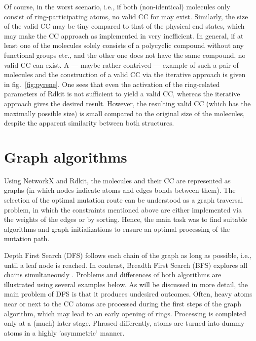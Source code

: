 Of course, in the worst scenario, i.e., if both (non-identical) molecules only consist of ring-participating atoms, no valid CC for \trafo may exist. Similarly, the size of the valid CC may be tiny compared to that of the physical end states, which may make the CC approach as implemented in \trafo very inefficient.  In general, if at least one of the molecules solely consists of a polycyclic compound without any functional groups etc., and the other one does not have the same compound, no valid CC can exist. 
A --- maybe rather contrived --- example of such a pair of molecules and the construction of a valid CC via the iterative approach is given in fig.~\ref{fig:pyrene}. One sees that even the activation of the ring-related parameters of Rdkit is not sufficient to yield a valid CC, whereas the iterative approach gives the desired result. However, the resulting valid CC (which has the maximally possible size) is small compared to the original size of the molecules, despite the apparent similarity between both structures.



\section{Graph algorithms}

Using NetworkX and Rdkit, the molecules and their CC are
represented as graphs (in which nodes indicate atoms and edges bonds
between them). The selection of the optimal mutation route can be
understood as a graph traversal problem, in which the constraints mentioned
above are either implemented via the weights of the edges or by sorting.
Hence, the main task was to find suitable algorithms and graph initializations
to ensure an optimal processing of the mutation path.

Depth First Search (DFS) follows each chain of the graph as long as
possible, i.e., until a leaf node is reached. In contrast, Breadth
First Search (BFS) explores all chains simultaneously \cite{Even.2012}.
Problems and differences of both algorithms are illustrated using
several examples below. As will be discussed in more detail, the main problem of DFS is that it produces undesired outcomes. Often, heavy atoms near or next to the CC atoms are processed during the first steps of the graph algorithm, which may lead to an early opening of rings. Processing is completed only at a (much) later stage. Phrased differently, atoms are turned into dummy atoms in a highly 'asymmetric' manner.   

